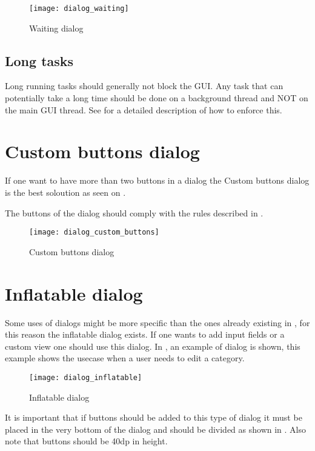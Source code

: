 \begin{figure}[h]
	\centering
	\texttt{[image: dialog\_waiting]}
	\caption{Waiting dialog}
	\label{fig:dialog_waiting}
\end{figure}
\FloatBarrier

\subsection{Long tasks}
\label{sub:long_tasks}
Long running tasks should generally not block the GUI. Any task that can potentially take a long time should be done on a background thread and NOT on the main GUI thread. See  for a detailed description of how to enforce this. 

\section{Custom buttons dialog}
\label{sec:custom_buttons_dialog}

If one want to have more than two buttons in a dialog the Custom buttons dialog is the best soloution as seen on . 

\begin{note}
	The buttons of the dialog should comply with the rules described in .
\end{note}

\begin{figure}[h]
	\centering
	\texttt{[image: dialog\_custom\_buttons]}
	\caption{Custom buttons dialog}
	\label{fig:custom_buttons_dialog}
\end{figure}
\FloatBarrier

\section{Inflatable dialog}
\label{sec:inflatable_dialog}

Some uses of dialogs might be more specific than the ones already existing in \gc, for this reason the inflatable dialog exists. If one wants to add input fields or a custom view one should use this dialog. In , an example of dialog is shown, this example shows the usecase when a user needs to edit a category.

\begin{figure}[h]
	\centering
	\texttt{[image: dialog\_inflatable]}
	\caption{Inflatable dialog}
	\label{fig:inflatable_dialog}
\end{figure}
\FloatBarrier

\begin{note}
	It is important that if buttons should be added to this type of dialog it must be placed in the very bottom of the dialog and should be divided as shown in . Also note that buttons should be 40dp in height.
\end{note}

